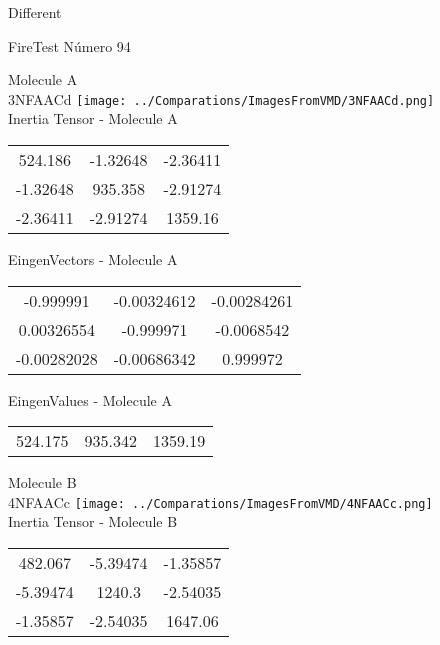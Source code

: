 \begin{center}
\vtab
\vtab
\textcolor{NavyBlue}{\Large Different}
\end{center}

 \newpage

\vtab[-2cm]
\begin{center}
{\large FireTest \tab Número 94}
\end{center}
\begin{multicols}{2}
\begin{center}

Molecule A \\ 
3NFAACd
\texttt{[image: ../Comparations/ImagesFromVMD/3NFAACd.png]}
\\
Inertia Tensor - Molecule A \\
\vtab

\begin{tabular}{|c c c|}
524.186	 & 	-1.32648	 & 	-2.36411	 \\
-1.32648	 & 	935.358	 & 	-2.91274	 \\
-2.36411	 & 	-2.91274	 & 	1359.16
\end{tabular}

\vtab
 EingenVectors - Molecule A     \\
\vtab
\begin{tabular}{|c c c|}
-0.999991	 & 	-0.00324612	 & 	-0.00284261	 \\
0.00326554	 & 	-0.999971	 & 	-0.0068542	 \\
-0.00282028	 & 	-0.00686342	 & 	0.999972
\end{tabular}

\vtab
 EingenValues - Molecule A     \\
\vtab
\begin{tabular}{|c c c|}
524.175	 & 	935.342	 & 	1359.19	 \\
\end{tabular}
\columnbreak

Molecule B \\ 
4NFAACc
\texttt{[image: ../Comparations/ImagesFromVMD/4NFAACc.png]}
\\
Inertia Tensor - Molecule B \\
\vtab

\begin{tabular}{|c c c|}
482.067	 & 	-5.39474	 & 	-1.35857	 \\
-5.39474	 & 	1240.3	 & 	-2.54035	 \\
-1.35857	 & 	-2.54035	 & 	1647.06
\end{tabular}


\end{center}
\end{multicols}
